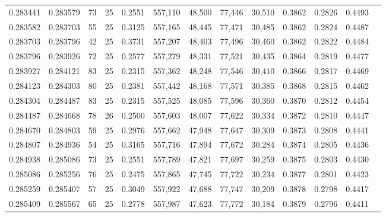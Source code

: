 \begin{tabular}{rrrrrrrrrrrrr}
0.283441 & 0.283579 &    73 &  25 &                                     0.2551 & 557,110 &  48,500 &  77,446 &  30,510 & 0.3862 & 0.2826 & 0.4493 \\
0.283582 & 0.283703 &    55 &  25 &                                     0.3125 & 557,165 &  48,445 &  77,471 &  30,485 & 0.3862 & 0.2824 & 0.4487 \\
0.283703 & 0.283796 &    42 &  25 &                                     0.3731 & 557,207 &  48,403 &  77,496 &  30,460 & 0.3862 & 0.2822 & 0.4484 \\
0.283796 & 0.283926 &    72 &  25 &                                     0.2577 & 557,279 &  48,331 &  77,521 &  30,435 & 0.3864 & 0.2819 & 0.4477 \\
0.283927 & 0.284121 &    83 &  25 &                                     0.2315 & 557,362 &  48,248 &  77,546 &  30,410 & 0.3866 & 0.2817 & 0.4469 \\
0.284123 & 0.284303 &    80 &  25 &                                     0.2381 & 557,442 &  48,168 &  77,571 &  30,385 & 0.3868 & 0.2815 & 0.4462 \\
0.284304 & 0.284487 &    83 &  25 &                                     0.2315 & 557,525 &  48,085 &  77,596 &  30,360 & 0.3870 & 0.2812 & 0.4454 \\
0.284487 & 0.284668 &    78 &  26 &                                     0.2500 & 557,603 &  48,007 &  77,622 &  30,334 & 0.3872 & 0.2810 & 0.4447 \\
0.284670 & 0.284803 &    59 &  25 &                                     0.2976 & 557,662 &  47,948 &  77,647 &  30,309 & 0.3873 & 0.2808 & 0.4441 \\
0.284807 & 0.284936 &    54 &  25 &                                     0.3165 & 557,716 &  47,894 &  77,672 &  30,284 & 0.3874 & 0.2805 & 0.4436 \\
0.284938 & 0.285086 &    73 &  25 &                                     0.2551 & 557,789 &  47,821 &  77,697 &  30,259 & 0.3875 & 0.2803 & 0.4430 \\
0.285086 & 0.285256 &    76 &  25 &                                     0.2475 & 557,865 &  47,745 &  77,722 &  30,234 & 0.3877 & 0.2801 & 0.4423 \\
0.285259 & 0.285407 &    57 &  25 &                                     0.3049 & 557,922 &  47,688 &  77,747 &  30,209 & 0.3878 & 0.2798 & 0.4417 \\
0.285409 & 0.285567 &    65 &  25 &                                     0.2778 & 557,987 &  47,623 &  77,772 &  30,184 & 0.3879 & 0.2796 & 0.4411 \\

\end{tabular}

